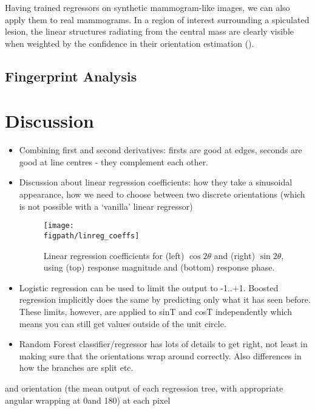 Having trained regressors on synthetic mammogram-like images, we can also apply them to real mammograms. In a region of interest surrounding a spiculated lesion, the linear structures radiating from the central mass are clearly visible when weighted by the confidence in their orientation estimation ().


\subsection{Fingerprint Analysis}
\label{s:expts_fingerprints}


\section{Discussion}
\label{s:discussion}
\begin{itemize}
\item Combining first and second derivatives: firsts are good at edges, seconds are good at line centres - they complement each other.

\item Discussion about linear regression coefficients: how they take a sinusoidal appearance, how we need to choose between two discrete orientations (which is not possible with a `vanilla' linear regressor)
%
\begin{figure}[t]
	\centering
		\texttt{[image: \\figpath/linreg\_coeffs]}
	\caption{Linear regression coefficients for (left) $\cos 2\theta$ and (right) $\sin 2\theta$, using (top) response magnitude and (bottom) response phase.}
	\label{f:linreg_coeffs}
\end{figure}

\item Logistic regression can be used to limit the output to -1..+1. Boosted regression implicitly does the same by predicting only what it has seen before. These limits, however, are applied to sinT and cosT independently which means you can still get values outside of the unit circle.

\item Random Forest classifier/regressor has lots of details to get right, not least in making sure that the orientations wrap around correctly. Also differences in how the branches are split etc.

\end{itemize}

and orientation (the mean output of each regression tree, with appropriate angular wrapping at 0\deg and 180\deg) at each pixel

